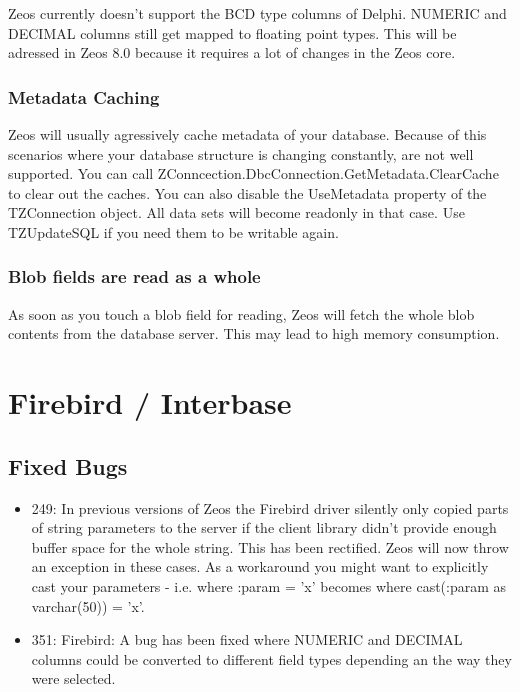 \documentclass[a4paper,12pt,oneside]{book}
\begin{document}
Zeos currently doesn't support the BCD type columns of Delphi.
NUMERIC and DECIMAL columns still get mapped to floating point types.
This will be adressed in Zeos 8.0 because it requires a lot of changes in the Zeos core.

\subsubsection{Metadata Caching}
\label{sec:Rev6_General_KnownProblems_MetadataCaching}

Zeos will usually agressively cache metadata of your database.
Because of this scenarios where your database structure is changing constantly, are not well supported.
You can call ZConncection.\-DbcConnection.\-GetMetadata.\-ClearCache to clear out the caches.
You can also disable the UseMetadata property of the TZConnection object.
All data sets will become readonly in that case.
Use TZUpdateSQL if you need them to be writable again.

\subsubsection{Blob fields are read as a whole}
\label{sec:Rev6_General_KnownProblems_BlobFields}

As soon as you touch a blob field for reading, Zeos will fetch the whole blob contents from the database server.
This may lead to high memory consumption.

\section{Firebird / Interbase}
\label{sec:Rev6_FirebirdInterbase}

\subsection{Fixed Bugs}
\label{sec:Rev6_FirebirdInterbase_FixedBugs}

\begin{itemize}
\item 
  249: In previous versions of Zeos the Firebird driver silently only copied parts of string parameters to the server if the client library didn't provide enough buffer space for the whole string.
	This has been rectified.
	Zeos will now throw an exception in these cases.
	As a workaround you might want to explicitly cast your parameters - i.e. where :param = 'x' becomes where cast(:param as varchar(50)) = 'x'.
\item
  351: Firebird: A bug has been fixed where NUMERIC and DECIMAL columns could be converted to different field types depending an the way they were selected.
\end{itemize}
\end{document}
